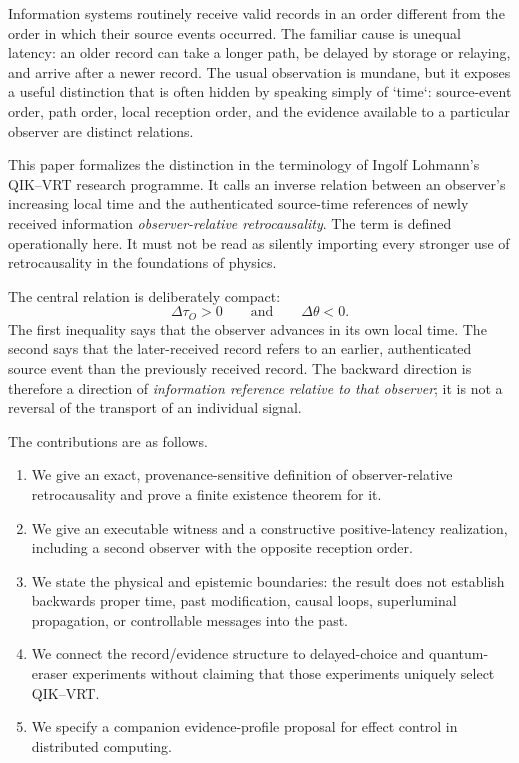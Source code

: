 \documentclass[11pt]{article}
\theoremstyle{remark}
\begin{document}
Information systems routinely receive valid records in an order different from
the order in which their source events occurred. The familiar cause is unequal
latency: an older record can take a longer path, be delayed by storage or
relaying, and arrive after a newer record. The usual observation is mundane,
but it exposes a useful distinction that is often hidden by speaking simply of
`time`: source-event order, path order, local reception order, and the
evidence available to a particular observer are distinct relations.

This paper formalizes the distinction in the terminology of Ingolf Lohmann's
QIK--VRT research programme. It calls an inverse relation between an
observer's increasing local time and the authenticated source-time references
of newly received information \emph{observer-relative retrocausality}. The
term is defined operationally here. It must not be read as silently importing
every stronger use of retrocausality in the foundations of physics.

The central relation is deliberately compact:
\begin{equation}
  \Delta\tau_O>0 \qquad\text{and}\qquad \Delta\theta<0.
  \label{eq:core}
\end{equation}
The first inequality says that the observer advances in its own local time.
The second says that the later-received record refers to an earlier,
authenticated source event than the previously received record. The
backward direction is therefore a direction of \emph{information reference
relative to that observer}; it is not a reversal of the transport of an
individual signal.

The contributions are as follows.
\begin{enumerate}
  \item We give an exact, provenance-sensitive definition of observer-relative
  retrocausality and prove a finite existence theorem for it.
  \item We give an executable witness and a constructive positive-latency
  realization, including a second observer with the opposite reception order.
  \item We state the physical and epistemic boundaries: the result does not
  establish backwards proper time, past modification, causal loops,
  superluminal propagation, or controllable messages into the past.
  \item We connect the record/evidence structure to delayed-choice and
  quantum-eraser experiments without claiming that those experiments uniquely
  select QIK--VRT.
  \item We specify a companion evidence-profile proposal for effect control in
  distributed computing.
\end{enumerate}
\end{document}
